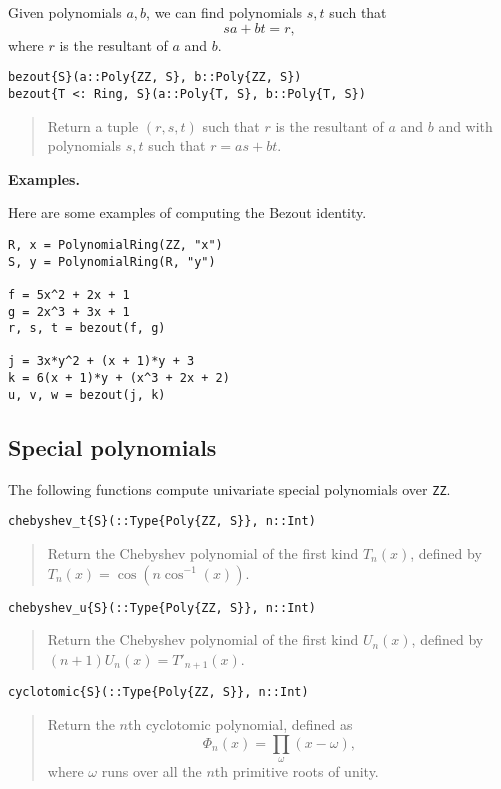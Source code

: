 \documentclass[a4paper,10pt]{article}
\newcommand{\code}{\lstinline}
\newcommand{\desc}[1]{\vspace{-3mm}\begin{quote}#1\end{quote}}
\begin{document}
{{{{{{Given polynomials $a, b$, we can find polynomials $s, t$ such that
$$sa + bt = r,$$
where $r$ is the resultant of $a$ and $b$.

\begin{lstlisting}
bezout{S}(a::Poly{ZZ, S}, b::Poly{ZZ, S})
bezout{T <: Ring, S}(a::Poly{T, S}, b::Poly{T, S})
\end{lstlisting}

\desc{Return a tuple $(r, s, t)$ such that $r$ is the resultant of $a$ and $b$
and with polynomials $s, t$ such that $r = as + bt$.}

\textbf{Examples.}

Here are some examples of computing the Bezout identity.

\begin{lstlisting}
R, x = PolynomialRing(ZZ, "x")
S, y = PolynomialRing(R, "y")

f = 5x^2 + 2x + 1
g = 2x^3 + 3x + 1
r, s, t = bezout(f, g)

j = 3x*y^2 + (x + 1)*y + 3
k = 6(x + 1)*y + (x^3 + 2x + 2)
u, v, w = bezout(j, k)
\end{lstlisting}

\subsection{Special polynomials}

The following functions compute univariate special polynomials over \code{ZZ}.

\begin{lstlisting}
chebyshev_t{S}(::Type{Poly{ZZ, S}}, n::Int)
\end{lstlisting}

\desc{Return the Chebyshev polynomial of the first kind $T_n(x)$, defined by 
$T_n(x) = \cos(n \cos^{-1}(x))$.}

\begin{lstlisting}
chebyshev_u{S}(::Type{Poly{ZZ, S}}, n::Int)
\end{lstlisting}

\desc{Return the Chebyshev polynomial of the first kind $U_n(x)$, defined by 
$(n+1) U_n(x) = T'_{n+1}(x)$.}

\begin{lstlisting}
cyclotomic{S}(::Type{Poly{ZZ, S}}, n::Int)
\end{lstlisting}

\desc{Return the $n$th cyclotomic polynomial, defined as
$$\Phi_n(x) = \prod_{\omega} (x-\omega),$$ where $\omega$ runs over all the 
$n$th primitive roots of unity.}

}}}}}}
\end{document}
